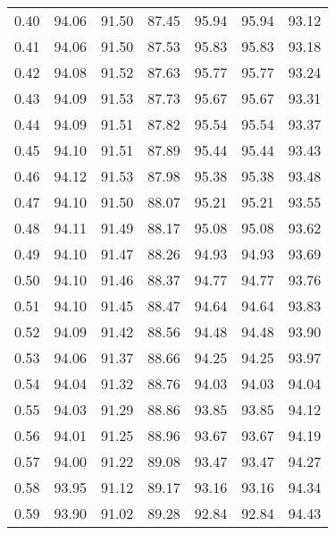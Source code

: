 \begin{tabular}{|c|c|c|c|c|c|c|}
      0.40 &     94.06 &     91.50 &      87.45 &   95.94 &      95.94 &         93.12 \\
      0.41 &     94.06 &     91.50 &      87.53 &   95.83 &      95.83 &         93.18 \\
      0.42 &     94.08 &     91.52 &      87.63 &   95.77 &      95.77 &         93.24 \\
      0.43 &     94.09 &     91.53 &      87.73 &   95.67 &      95.67 &         93.31 \\
      0.44 &     94.09 &     91.51 &      87.82 &   95.54 &      95.54 &         93.37 \\
      0.45 &     94.10 &     91.51 &      87.89 &   95.44 &      95.44 &         93.43 \\
      0.46 &     94.12 &     91.53 &      87.98 &   95.38 &      95.38 &         93.48 \\
      0.47 &     94.10 &     91.50 &      88.07 &   95.21 &      95.21 &         93.55 \\
      0.48 &     94.11 &     91.49 &      88.17 &   95.08 &      95.08 &         93.62 \\
      0.49 &     94.10 &     91.47 &      88.26 &   94.93 &      94.93 &         93.69 \\
      0.50 &     94.10 &     91.46 &      88.37 &   94.77 &      94.77 &         93.76 \\
      0.51 &     94.10 &     91.45 &      88.47 &   94.64 &      94.64 &         93.83 \\
      0.52 &     94.09 &     91.42 &      88.56 &   94.48 &      94.48 &         93.90 \\
      0.53 &     94.06 &     91.37 &      88.66 &   94.25 &      94.25 &         93.97 \\
      0.54 &     94.04 &     91.32 &      88.76 &   94.03 &      94.03 &         94.04 \\
      0.55 &     94.03 &     91.29 &      88.86 &   93.85 &      93.85 &         94.12 \\
      0.56 &     94.01 &     91.25 &      88.96 &   93.67 &      93.67 &         94.19 \\
      0.57 &     94.00 &     91.22 &      89.08 &   93.47 &      93.47 &         94.27 \\
      0.58 &     93.95 &     91.12 &      89.17 &   93.16 &      93.16 &         94.34 \\
      0.59 &     93.90 &     91.02 &      89.28 &   92.84 &      92.84 &         94.43 \\

\end{tabular}
